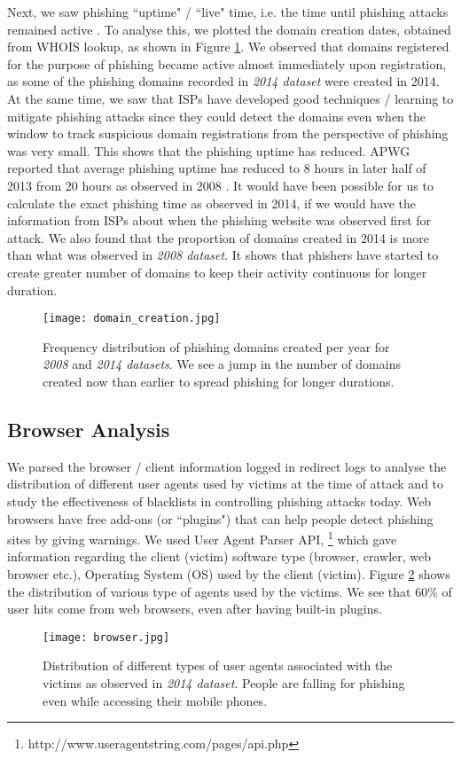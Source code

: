 \documentclass[conference]{IEEEtran}
\begin{document}
Next, we saw phishing ``uptime" / ``live" time, i.e. the time until phishing attacks remained active \cite{apwg}. To analyse this, we plotted the domain creation dates, obtained from WHOIS lookup, as shown in Figure \ref{fig:domain_creation}. We observed that domains registered for the purpose of phishing became active almost immediately upon registration, as some of the phishing domains recorded in \textit{2014 dataset} were created in 2014. At the same time, we saw that ISPs have developed good techniques / learning to mitigate phishing attacks since they could detect the domains even when the window to track suspicious domain registrations from the perspective of phishing was very small. This shows that the phishing uptime has reduced. APWG reported that average phishing uptime has reduced to 8 hours in later half of 2013 \cite{apwg} from 20 hours as observed in 2008 \cite{apwg10}. It would have been possible for us to calculate the exact phishing time as observed in 2014, if we would have the information from ISPs about when the phishing website was observed first for attack. We also found that the proportion of domains created in 2014 is more than what was observed in \textit{2008 dataset}. It shows that phishers have started to create greater number of domains to keep their activity continuous for longer duration.

\begin{figure}[h]
\centering
\texttt{[image: domain\_creation.jpg]}
\caption{Frequency distribution of phishing domains created per year for \textit{2008} and \textit{2014 datasets}. We see a jump in the number of domains created now than earlier to spread phishing for longer durations.}
\label{fig:domain_creation}
\end{figure}

\subsection{Browser Analysis}
We parsed the browser / client information logged in redirect logs to analyse the distribution of different user agents used by victims at the time of attack and to study the effectiveness of blacklists in controlling phishing attacks today. Web browsers have free add-ons (or ``plugins") that can help people detect phishing sites by giving warnings. We used User Agent Parser API, \footnote{http://www.useragentstring.com/pages/api.php} which gave information regarding the client (victim) software type (browser, crawler, web browser etc.), Operating System (OS) used by the client (victim). Figure \ref{fig:browser} shows the distribution of various type of agents used by the victims. We see that 60\% of user hits come from web browsers, even after having built-in plugins.
\begin{figure}[h]
\centering
\texttt{[image: browser.jpg]}
\caption{Distribution of different types of user agents associated with the victims as observed in \textit{2014 dataset}. People are falling for phishing even while accessing their mobile phones.}
\label{fig:browser}
\end{figure}
\end{document}
